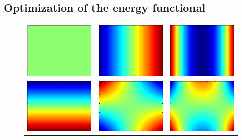 \subsection{Optimization of the energy functional}
\begin{figure}[ht]
\centering
\captionsetup{justification=centering}
\renewcommand{\tabcolsep}{0.05cm}
\begin{tabular}{@{}ccc @{}}
	\includegraphics[width=.3\textwidth]{./images/Bases_color/1}  &
	\includegraphics[width=.3\textwidth]{./images/Bases_color/2}  &
	\includegraphics[width=.3\textwidth]{./images/Bases_color/3}  \\
	\includegraphics[width=.3\textwidth]{./images/Bases_color/4}  &
	\includegraphics[width=.3\textwidth]{./images/Bases_color/5}  &
	\includegraphics[width=.3\textwidth]{./images/Bases_color/6}  \\

\end{tabular}
\end{figure}
